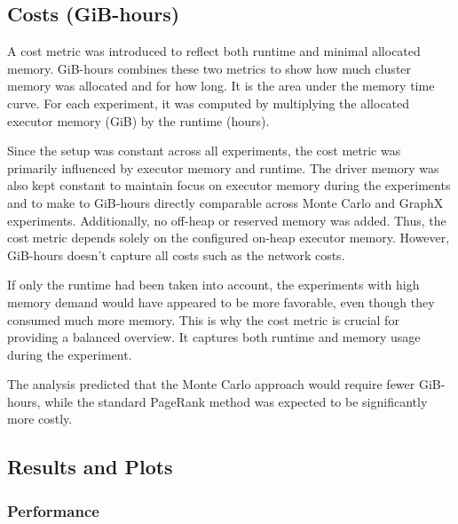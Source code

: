 \subsection{Costs (GiB-hours)}
A cost metric was introduced to reflect both runtime and minimal allocated memory. GiB-hours combines these two metrics to show how much cluster memory was allocated and for how long. It is the area under the memory time curve. For each experiment, it was computed by multiplying the allocated executor memory (GiB) by the runtime (hours). \par
Since the setup was constant across all experiments, the cost metric was primarily influenced by executor memory and runtime. The driver memory was also kept constant to maintain focus on executor memory during the experiments and to make to GiB-hours directly comparable across Monte Carlo and GraphX experiments. Additionally, no off-heap or reserved memory was added. Thus, the cost metric depends solely on the configured on-heap executor memory. However, GiB-hours doesn't capture all costs such as the network costs.\par
If only the runtime had been taken into account, the experiments with high memory demand would have appeared to be more favorable, even though they consumed much more memory. This is why the cost metric is crucial for providing a balanced overview. It captures both runtime and memory usage during the experiment. \par
The analysis predicted that the Monte Carlo approach would require fewer GiB-hours, while the standard PageRank method was expected to be significantly more costly.


\subsection{Results and Plots}

\subsubsection{Performance}

